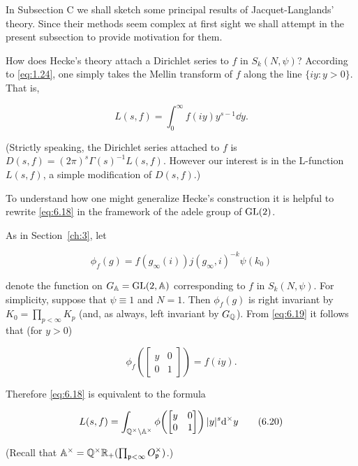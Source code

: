 In Subsection C we shall sketch some principal results of Jacquet-Langlands' theory. Since their methods seem complex at first sight we shall attempt in the present subsection to provide motivation for them.

How does Hecke's theory attach a Dirichlet series to $f$ in $S_k(N, \psi)$? According to \eqref{eq:1.24}, one simply takes the Mellin transform of $f$ along the line $\{iy : y > 0\}$. That is,

\begin{equation}\label{eq:6.18}
L(s, f) = \int_0^{\infty} f(iy) y^{s-1} \dd y.\tag{6.18}
\end{equation}

(Strictly speaking, the Dirichlet series attached to $f$ is $D(s,f) = (2\pi)^s\Gamma(s)^{-1}L(s,f)$. However our interest is in the L-function $L(s,f)$, a simple modification of $D(s,f)$.)

To understand how one might generalize Hecke's construction it is helpful to rewrite \eqref{eq:6.18} in the framework of the adele group of $\operatorname{GL}(2)$.

As in Section~\ref{ch:3}, let

\begin{equation}\label{eq:6.19}
\phi_f(g) = f(g_{\infty}(i)) j(g_{\infty}, i)^{-k} \psi(k_0)\tag{6.19}
\end{equation}

denote the function on $G_{\mathbb{A}} = \operatorname{GL}(2, \mathbb{A})$ corresponding to $f$ in $S_k(N, \psi)$. For simplicity, suppose that $\psi \equiv 1$ and $N = 1$. Then $\phi_f(g)$ is right invariant by $K_0 = \prod_{p < \infty} K_p$ (and, as always, left invariant by $G_{\mathbb{Q}}$). From \eqref{eq:6.19} it follows that (for $y > 0$)

\[
\phi_f\!\left(\begin{bmatrix} y & 0 \\ 0 & 1 \end{bmatrix}\right) = f(iy).
\]

Therefore \eqref{eq:6.18} is equivalent to the formula

\begin{equation}\label{eq:6.20}
L(s, f) = \int_{\mathbb{Q}^{\times} \backslash \mathbb{A}^{\times}} \phi\!\left(\begin{bmatrix} y & 0 \\ 0 & 1 \end{bmatrix}\right) |y|^s \mathrm{d}^{\times} y\tag{6.20}
\end{equation}

(Recall that $\mathbb{A}^{\times} = \mathbb{Q}^{\times}\mathbb{R}_{+}(\prod_{\mathfrak{p} < \infty} O_{\mathfrak{p}}^{\times})$.)

